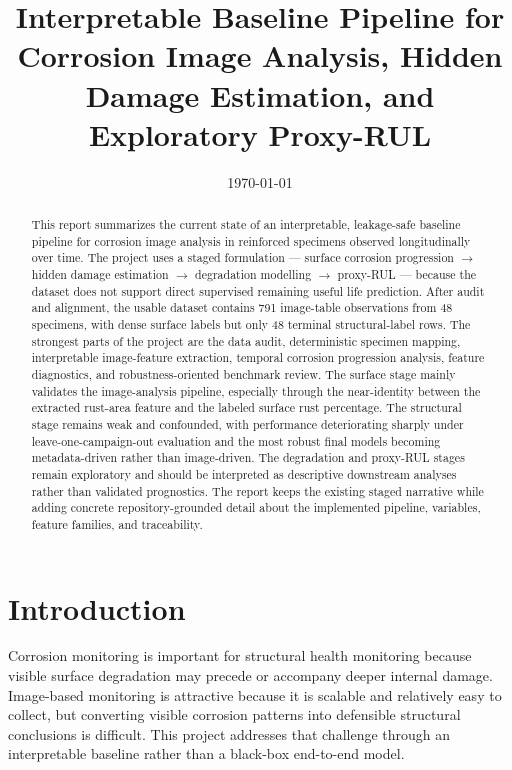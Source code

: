 \documentclass[10pt,a4paper,twocolumn]{article}
\title{\textbf{Interpretable Baseline Pipeline for Corrosion Image Analysis, Hidden Damage Estimation, and Exploratory Proxy-RUL}}
\author{}
\date{\today}
\begin{document}
\maketitle

\begin{abstract}
This report summarizes the current state of an interpretable, leakage-safe baseline pipeline for corrosion image analysis in reinforced specimens observed longitudinally over time. The project uses a staged formulation --- surface corrosion progression $\rightarrow$ hidden damage estimation $\rightarrow$ degradation modelling $\rightarrow$ proxy-RUL --- because the dataset does not support direct supervised remaining useful life prediction. After audit and alignment, the usable dataset contains 791 image-table observations from 48 specimens, with dense surface labels but only 48 terminal structural-label rows. The strongest parts of the project are the data audit, deterministic specimen mapping, interpretable image-feature extraction, temporal corrosion progression analysis, feature diagnostics, and robustness-oriented benchmark review. The surface stage mainly validates the image-analysis pipeline, especially through the near-identity between the extracted rust-area feature and the labeled surface rust percentage. The structural stage remains weak and confounded, with performance deteriorating sharply under leave-one-campaign-out evaluation and the most robust final models becoming metadata-driven rather than image-driven. The degradation and proxy-RUL stages remain exploratory and should be interpreted as descriptive downstream analyses rather than validated prognostics. The report keeps the existing staged narrative while adding concrete repository-grounded detail about the implemented pipeline, variables, feature families, and traceability.
\end{abstract}

\section{Introduction}

Corrosion monitoring is important for structural health monitoring because visible surface degradation may precede or accompany deeper internal damage. Image-based monitoring is attractive because it is scalable and relatively easy to collect, but converting visible corrosion patterns into defensible structural conclusions is difficult. This project addresses that challenge through an interpretable baseline rather than a black-box end-to-end model.
\end{document}

